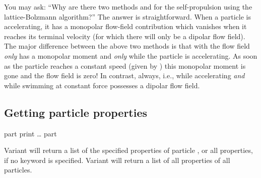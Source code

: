 \begin{arguments}
  \noindent
  You may ask: ``Why are there two methods  and
   for the self-propulsion using the lattice-Bolzmann
  algorithm?'' The answer is straightforward. When a particle is
  accelerating, it has a monopolar flow-field contribution which
  vanishes when it reaches its terminal velocity (for which there will
  only be a dipolar flow field). The major difference between the
  above two methods is that with  the flow field
  \emph{only} has a monopolar moment and \emph{only} while the
  particle is accelerating. As soon as the particle reaches a constant
  speed (given by ) this monopolar moment is gone and the
  flow field is zero! In contrast,  always, i.e., while
  accelerating \emph{and} while swimming at constant force possesses a
  dipolar flow field.

  \noindent
\end{arguments}


\subsection{Getting particle properties}
\begin{essyntax}
  part  print
  \dots
   part
\end{essyntax}

Variant  will return a list of the specified properties of
particle , or all properties, if no keyword is
specified.  Variant  will return a list of all properties
of all particles.

